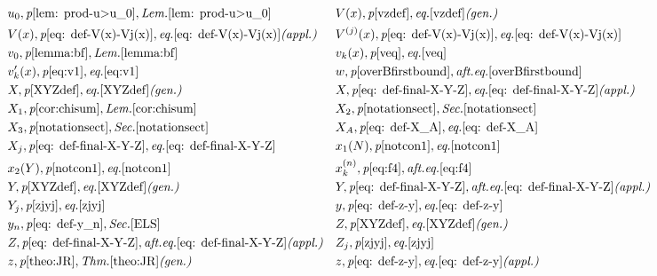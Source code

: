 \documentclass[12pt]{amsart}
\begin{document}
{\begin{align*}
    &u_0,\textit{p}\pageref{lem: prod-u>u_0}, \textit{Lem.} \ref{lem: prod-u>u_0}&
    &V(x),\textit{p}\pageref{vzdef},\textit{eq.}\eqref{vzdef}\textit{(gen.)}\\ 
    &V(x),\textit{p}\pageref{eq: def-V(x)-Vj(x)},\textit{eq.}\eqref{eq: def-V(x)-Vj(x)}\textit{(appl.) }&
    &V^{(j)}(x),\textit{p}\pageref{eq: def-V(x)-Vj(x)},\textit{eq.}\eqref{eq: def-V(x)-Vj(x)}\\
    &v_0,\textit{p}\pageref{lemma:bf}, \textit{Lem.} \ref{lemma:bf}&
    &v_k(x),\textit{p}\pageref{veq},\textit{eq.}\eqref{veq}\\
    &v_k'(x),\textit{p}\pageref{eq:v1},\textit{eq.}\eqref{eq:v1}&
    &w,\textit{p}\pageref{overBfirstbound}, \textit{aft.eq.} \eqref{overBfirstbound}\\
    &X,\textit{p}\pageref{XYZdef},\textit{eq.}\eqref{XYZdef} \textit{(gen.)}&
    &X,\textit{p}\pageref{eq: def-final-X-Y-Z},\textit{eq.}\eqref{eq: def-final-X-Y-Z} \textit{(appl.)}\\
    &X_1, \textit{p}\pageref{cor:chisum}, \textit{Lem.} \ref{cor:chisum}&
    &X_2,\textit{p}\pageref{notationsect}, \textit{Sec.} \ref{notationsect}\\
    &X_3,\textit{p}\pageref{notationsect}, \textit{Sec.} \ref{notationsect}&
    &X_A, \textit{p}\pageref{eq: def-X_A},\textit{eq.}\eqref{eq: def-X_A}\\
    &X_j,\textit{p}\pageref{eq: def-final-X-Y-Z},\textit{eq.}\eqref{eq: def-final-X-Y-Z}&
    &x_1(N),\textit{p}\pageref{notcon1},\textit{eq.}\eqref{notcon1}\\
    &x_2(Y),\textit{p}\pageref{notcon1},\textit{eq.}\eqref{notcon1}&
    &x^{(n)}_k,\textit{p}\pageref{eq:f4}, \textit{aft.eq.} \eqref{eq:f4}\\
    &Y,\textit{p}\pageref{XYZdef},\textit{eq.}\eqref{XYZdef} \textit{(gen.)}&
    &Y,\textit{p}\pageref{eq: def-final-X-Y-Z},\textit{aft.eq.}\eqref{eq: def-final-X-Y-Z} \textit{(appl.)}\\
    &Y_j,\textit{p}\pageref{zjyj},\textit{eq.}\eqref{zjyj}&
    &y,\textit{p}\pageref{eq: def-z-y},\textit{eq.}\eqref{eq: def-z-y}\\
    &y_n,\textit{p}\pageref{eq: def-y_n}, \textit{Sec.} \ref{ELS}&
    &Z,\textit{p}\pageref{XYZdef},\textit{eq.}\eqref{XYZdef} \textit{(gen.)}\\
    &Z,\textit{p}\pageref{eq: def-final-X-Y-Z},\textit{aft.eq.}\eqref{eq: def-final-X-Y-Z} \textit{(appl.)}&
    &Z_j,\textit{p}\pageref{zjyj},\textit{eq.}\eqref{zjyj}\\
    &z,\textit{p}\pageref{theo:JR},\textit{Thm.} \ref{theo:JR} \textit{(gen.)}&
    &z,\textit{p}\pageref{eq: def-z-y},\textit{eq.}\eqref{eq: def-z-y} \textit{(appl.)}
\end{align*}
}
\end{document}

